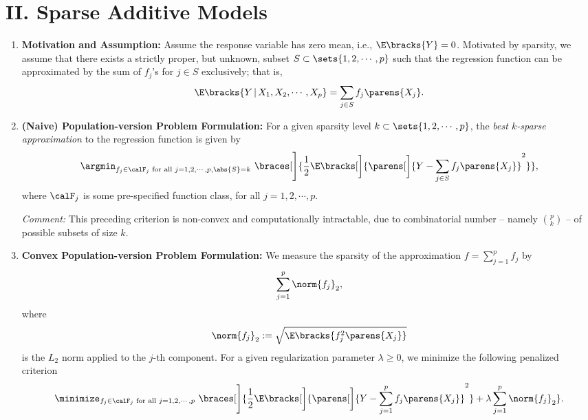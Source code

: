 \documentclass[12pt]{article}
\begin{document}
\section*{II. Sparse Additive Models}

\begin{enumerate}[label=\textbf{\arabic*.}]
	
	\item \textbf{Motivation and Assumption:} Assume the response variable has zero mean, i.e., $\E \bracks{Y} = 0$. Motivated by sparsity, we assume that there exists a strictly proper, but unknown, subset $S \subset \sets{1, 2, \cdots, p}$ such that the regression function can be approximated by the sum of $f_j$'s for $j \in S$ exclusively; that is, 
	\begin{align*}
		\E \bracks{Y \,\vert\, X_1, X_2, \cdots, X_p} = \sum_{j \in S} f_j \parens{X_j}. 
	\end{align*}
	
	\item \textbf{(Naive) Population-version Problem Formulation:} For a given sparsity level $k \subset \sets{1, 2, \cdots, p}$, the \emph{best $k$-sparse approximation} to the regression function is given by 
	\begin{align*}
		\argmin_{f_j \in \calF_j \text{ for all } j = 1, 2, \cdots, p, \abs{S} = k} \ \braces[\Bigg]{ \frac{1}{2} \E \bracks[\bigg]{ \parens[\bigg]{Y - \sum_{j \in S} f_j \parens{X_{j}}}^2}}, 
	\end{align*}
	where $\calF_j$ is some pre-specified function class, for all $j = 1, 2, \cdots, p$. 
	
	\textit{Comment:} This preceding criterion is non-convex and computationally intractable, due to combinatorial number -- namely ${p \choose k}$ -- of possible subsets of size $k$. 

	\item \textbf{Convex Population-version Problem Formulation:} We measure the sparsity of the approximation $f = \sum_{j=1}^p f_j$ by 
	\begin{align*}
		\sum_{j=1}^p \norm{f_j}_{2}, 
	\end{align*}
	where 
	\begin{align*}
		\norm{f_j}_2 := \sqrt{\E \bracks{f_j^2 \parens{X_j}}}
	\end{align*}
	is the $L_2$ norm applied to the $j$-th component. For a given regularization parameter $\lambda \ge 0$, we minimize the following penalized criterion 
	\begin{align}\label{eq-spam-formulation}
		\minimize_{f_j \in \calF_j \text{ for all } j = 1, 2, \cdots, p} \ \braces[\Bigg]{ \frac{1}{2} \E \bracks[\bigg]{ \parens[\bigg]{Y - \sum_{j=1}^p f_j \parens{X_{j}}}^2} + \lambda \sum_{j=1}^p \norm{f_j}_2}. 
	\end{align}
	

\end{enumerate}
\end{document}
